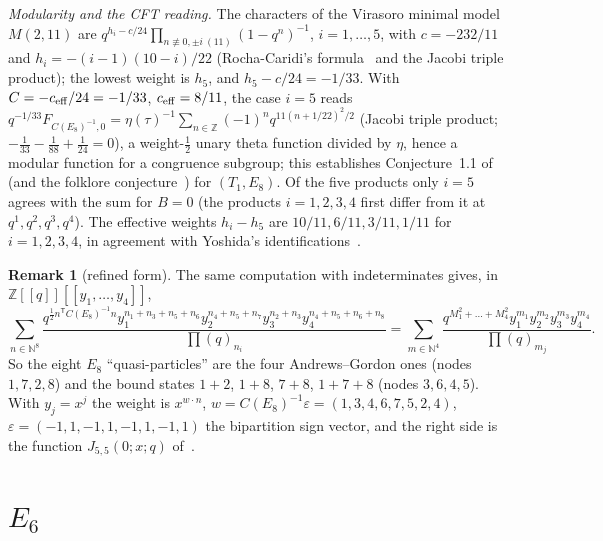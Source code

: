 \documentclass[11pt]{amsart}
\theoremstyle{definition}
\newtheorem{remark}[theorem]{Remark}
\numberwithin{equation}{section}
\newcommand{\Z}{\mathbb{Z}}
\newcommand{\N}{\mathbb{N}}
\newcommand{\T}{\mathsf T}
\begin{document}
\emph{Modularity and the CFT reading.} The characters of the Virasoro minimal model $M(2,11)$ are
$q^{h_i-c/24}\prod_{n\not\equiv0,\pm i\ (11)}(1-q^n)^{-1}$, $i=1,\dots,5$, with $c=-232/11$ and
$h_i=-(i-1)(10-i)/22$ (Rocha-Caridi's formula~\cite{RC} and the Jacobi triple product); the lowest weight
is $h_5$, and $h_5-c/24=-1/33$. With $C=-c_{\rm eff}/24=-1/33$, $c_{\rm eff}=8/11$, the case $i=5$ reads
$q^{-1/33}F_{C(E_8)^{-1},0}=\eta(\tau)^{-1}\sum_{n\in\Z}(-1)^nq^{11(n+1/22)^2/2}$ (Jacobi triple product;
$-\frac1{33}-\frac1{88}+\frac1{24}=0$), a weight-$\frac12$ unary theta function divided by $\eta$, hence a
modular function for a congruence subgroup; this establishes Conjecture~1.1 of~\cite{SW} (and the
folklore conjecture~\cite[Conjecture~1.1]{WW-Dr}) for $(T_1,E_8)$. Of the five products only $i=5$
agrees with the sum for $B=0$ (the products $i=1,2,3,4$ first differ from it at $q^1,q^2,q^3,q^4$). The
effective weights $h_i-h_5$ are $10/11,6/11,3/11,1/11$ for $i=1,2,3,4$, in agreement with Yoshida's
identifications~\cite[(3.77)--(3.80)]{Yoshida}.

\begin{remark}[refined form]
The same computation with indeterminates gives, in $\Z[[q]][[y_1,\dots,y_4]]$,
\[
\sum_{n\in\N^8}\frac{q^{\frac12n^{\T}C(E_8)^{-1}n}y_1^{n_1+n_3+n_5+n_6}y_2^{n_4+n_5+n_7}y_3^{n_2+n_3}y_4^{n_4+n_5+n_6+n_8}}{\prod(q)_{n_i}}
=\sum_{m\in\N^4}\frac{q^{M_1^2+\dots+M_4^2}y_1^{m_1}y_2^{m_2}y_3^{m_3}y_4^{m_4}}{\prod(q)_{m_j}} .
\]
So the eight $E_8$ ``quasi-particles'' are the four Andrews--Gordon ones (nodes $1,7,2,8$) and the bound
states $1+2$, $1+8$, $7+8$, $1+7+8$ (nodes $3,6,4,5$). With $y_j=x^j$ the weight is $x^{w\cdot n}$,
$w=C(E_8)^{-1}\varepsilon=(1,3,4,6,7,5,2,4)$, $\varepsilon=(-1,1,-1,1,-1,1,-1,1)$ the bipartition sign vector,
and the right side is the function $J_{5,5}(0;x;q)$ of~\cite[Ch.~7]{AndrewsBook}.
\end{remark}

\section{\texorpdfstring{$E_6$}{E6}}\label{sec:E6}
\end{document}
